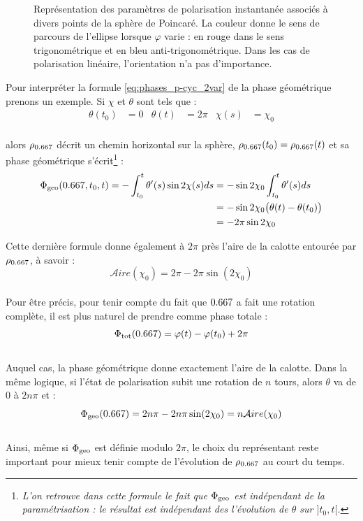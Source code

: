 \begin{figure}[H]
	
	\caption[\DONE États de polarisation associés à divers point de la sphère de Poincaré.]{Représentation des paramètres de polarisation instantanée associés à divers points de la sphère de Poincaré. La couleur donne le sens de parcours de l'ellipse lorsque $\varphi$ varie : en rouge dans le sens trigonométrique et en bleu anti-trigonométrique. Dans les cas de polarisation linéaire, l'orientation n'a pas d'importance.}
\end{figure}


Pour interpréter la formule \eqref{eq:phases_p-cyc_2var} de la phase géométrique prenons un exemple. Si $\chi$ et $\theta$ sont tels que :
\begin{align*}
	\theta(t_0) &= 0  &  \theta(t) &= 2\pi  &  \chi(s) &= \chi_0
\end{align*}
\\
alors $\rho_{\x}$ décrit un chemin horizontal sur la sphère, $\rho_{\x}(t_0) = \rho_{\x}(t)$ et sa phase géométrique s'écrit\footnote{\itshape 
	L'on retrouve dans cette formule le fait que $\Phi_{\text{\normalfont geo}}$ est indépendant de la paramétrisation : le résultat est indépendant des l'évolution de $\theta$ sur $]t_0,t[$.} :
\begin{align*}
	\phaseg(\x, t_0, t) = -\int_{t_0}^t \theta'(s) \sin 2\chi(s) ds &= - \sin 2\chi_0 \int_{t_0}^t \theta'(s) ds \\
	&= - \sin 2\chi_0 \big( \theta(t) - \theta(t_0)\big) \\
	&= - 2\pi\sin 2\chi_0
\end{align*}
\skipl

Cette dernière formule donne également à $2\pi$ près l’aire de la calotte entourée par $\rho_{\x}$, à savoir :
\[\mathcal{A}ire(\chi_0) = 2\pi - 2\pi \sin(2\chi_0)\]
\\
Pour être précis, pour tenir compte du fait que $\x$ a fait une rotation complète, il est plus naturel de prendre comme phase totale :
\[\phaset(\x) = \varphi(t) - \varphi(t_0) + 2\pi\]
\\
Auquel cas, la phase géométrique donne exactement l'aire de la calotte. Dans la même logique, si l'état de polarisation subit une rotation de $n$ tours, alors $\theta$ va de $0$ à $2n\pi$ et :
\[\phaseg(\x) = 2n\pi - 2n\pi\sin(2\chi_0) = n\mathcal{A}ire(\chi_0)\]
\\
Ainsi, même si $\Phi_{\text{\normalfont geo}}$ est définie modulo $2\pi$, le choix du représentant reste important pour mieux tenir compte de l'évolution de $\rho_{\x}$ au court du temps.
\\


